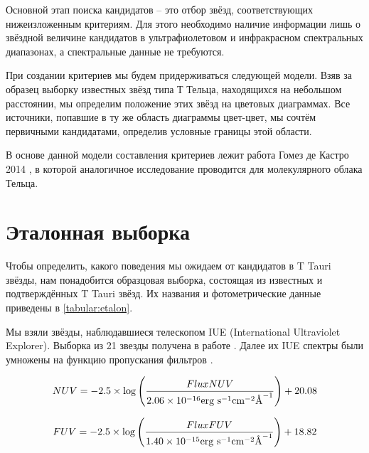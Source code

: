 Основной этап поиска кандидатов -- это отбор звёзд, соответствующих нижеизложенным критериям. Для этого необходимо наличие информации лишь о звёздной величине кандидатов в ультрафиолетовом и инфракрасном спектральных диапазонах, а спектральные данные не требуются.

При создании критериев мы будем придерживаться следующей модели. Взяв за образец выборку известных звёзд типа Т Тельца, находящихся на небольшом расстоянии, мы определим положение этих звёзд на цветовых диаграммах. Все источники, попавшие в ту же область диаграммы цвет-цвет, мы сочтём первичными кандидатами, определив условные границы этой области.

В основе данной модели составления критериев лежит работа Гомез де Кастро 2014 \cite{AIGdC2014galex}, в которой аналогичное исследование проводится для молекулярного облака Тельца.

\section{Эталонная выборка}
Чтобы определить, какого поведения мы ожидаем от кандидатов в T Tauri звёзды, нам понадобится образцовая выборка, состоящая из известных и подтверждённых T Tauri звёзд. Их названия и фотометрические данные приведены в \ref{tabular:etalon}.

Мы взяли звёзды, наблюдавшиеся телескопом IUE (International Ultraviolet Explorer). Выборка из 21 звезды получена в работе \cite{de1997accretion}. Далее их IUE спектры были умножены на функцию пропускания фильтров \cite{AIGdC2014galex}.

$$NUV = -2.5\times\log\left(\frac{FluxNUV}{2.06\times10^{-16}\text{erg }\text{s}^{-1}\text{cm}^{-2}\text{\normalfont\AA}^{-1}}\right) + 20.08$$

$$FUV = -2.5\times\log\left(\frac{FluxFUV}{1.40\times10^{-15}\text{erg }\text{s}^{-1}\text{cm}^{-2}\text{\normalfont\AA}^{-1}}\right) + 18.82$$
\vspace{1em}

